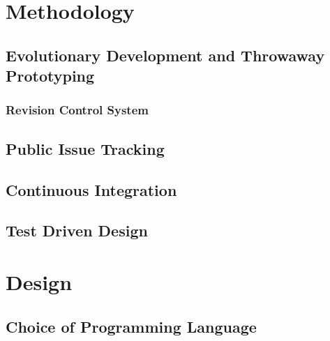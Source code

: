 \documentclass[12pt, a4paper]{article}
\begin{document}
\section{Methodology}


\subsection{Evolutionary Development and Throwaway Prototyping}


\subsubsection{Revision Control System}


\subsection{Public Issue Tracking}


\subsection{Continuous Integration}


\subsection{Test Driven Design}


\section{Design}


\subsection{Choice of Programming Language}
\end{document}

